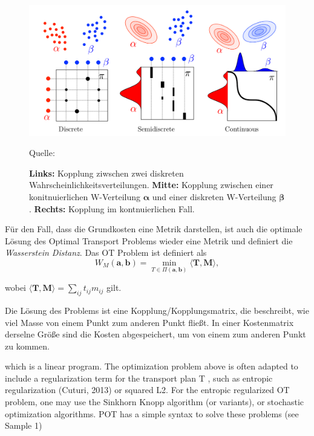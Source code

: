 \documentclass[11pt,a4paper]{article}
\newcommand{\source}[1]{\caption*{\hfill Quelle: {#1}} }
\numberwithin{equation}{section}
\begin{document}
	\begin{figure}[ht]
		\centering
		\includegraphics[width=0.4\textheight]{coupling_disc_semid_cont.png}
		\caption[Transportpläne im diskreten, semi-diskreten und kontinuierlichen Fall]{\textbf{Links: }Kopplung ziwschen zwei diskreten Wahrscheinlichkeitsverteilungen. \textbf{ Mitte: }Kopplung zwischen einer konitnuierlichen W-Verteilung $\boldsymbol{\alpha}$ und einer diskreten W-Verteilung $\boldsymbol{\beta}$. \textbf{Rechts: }Kopplung im kontnuierlichen Fall.}
		\source{\cite{COTcuturi}}
		\label{im:couplings}
	\end{figure}
	
	
	
	Für den Fall, dass die Grundkosten eine Metrik darstellen, ist auch die optimale Lösung des Optimal Transport Problems wieder eine Metrik \cite{cuturi2014ground} und definiert die \textit{Wasserstein Distanz}. Das OT Problem ist definiert als
	\begin{equation}
	W_M(\boldsymbol{a},\boldsymbol{b}) = \min_{T \in \Pi(\boldsymbol{a}, \boldsymbol{b})}{\langle \boldsymbol{T}, \boldsymbol{M} \rangle},
	\end{equation}
	
	wobei ${\langle \boldsymbol{T}, \boldsymbol{M} \rangle} = \sum_{ij}{t_{ij}m_{ij}}$ gilt.
	
	Die Lösung des Problems ist eine Kopplung/Kopplungsmatrix, die beschreibt, wie viel Masse von einem Punkt zum anderen Punkt fließt. In einer Kostenmatrix derselne Größe sind die Kosten abgespeichert, um von einem zum anderen Punkt zu kommen.
	
	which is a linear program. The optimization problem above is often adapted to include a
	regularization term for the transport plan T , such as entropic regularization (Cuturi, 2013)
	or squared L2. For the entropic regularized OT problem, one may use the Sinkhorn Knopp
	algorithm (or variants), or stochastic optimization algorithms. POT has a simple syntax to
	solve these problems (see Sample 1)
	
\end{document}
